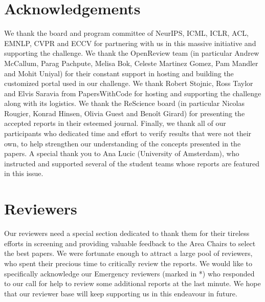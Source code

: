 \section{Acknowledgements}

We thank the board and program committee of NeurIPS, ICML, ICLR, ACL, EMNLP, CVPR and ECCV for partnering with us in this massive initiative and supporting the challenge. We thank the OpenReview team (in particular Andrew McCallum, Parag Pachpute, Melisa Bok, Celeste Martinez Gomez, Pam Mandler and Mohit Uniyal) for their constant support in hosting and building the customized portal used in our challenge. We thank Robert Stojnic, Ross Taylor and Elvis Saravia from PapersWithCode for hosting and supporting the challenge along with its logistics. We thank the ReScience board (in particular Nicolas Rougier, Konrad Hinsen, Olivia Guest and Benoît Girard) for presenting the accepted reports in their esteemed journal. Finally, we thank all of our participants who dedicated time and effort to verify results that were not their own, to help strengthen our understanding of the concepts presented in the papers.  A special thank you to Ana Lucic (University of Amsterdam), who instructed and supported several of the student teams whose reports are featured in this issue.

\section{Reviewers}

Our reviewers need a special section dedicated to thank them for their tireless efforts in screening and providing valuable feedback to the Area Chairs to select the best papers. We were fortunate enough to attract a large pool of reviewers, who spent their precious time to critically review the reports. We would like to specifically acknowledge  our Emergency reviewers (marked in *) who responded to our call for help to review some additional reports at the last minute. We hope that our reviewer base will keep supporting us in this endeavour in future.

